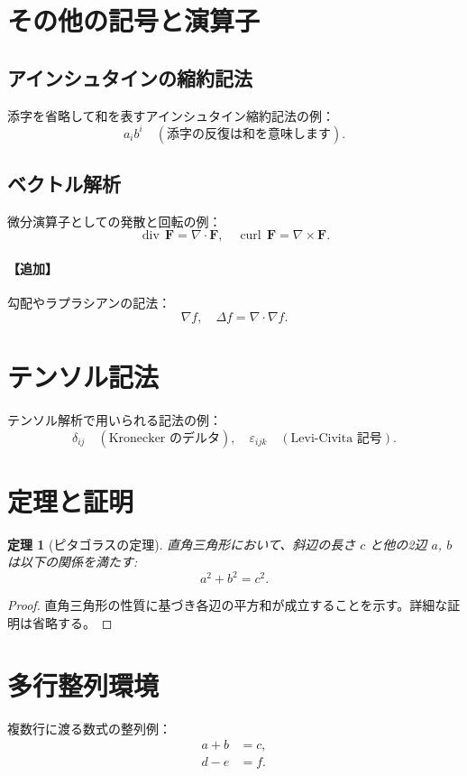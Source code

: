 \documentclass{ltjsarticle} %
\newtheorem{theorem}{定理}[section]
\begin{document}
\section{その他の記号と演算子}
\subsection{アインシュタインの縮約記法}
添字を省略して和を表すアインシュタイン縮約記法の例：
\[
  a_i b^i \quad (\text{添字の反復は和を意味します}).
\]

\subsection{ベクトル解析}
微分演算子としての発散と回転の例：
\[
  \operatorname{div} \, \mathbf{F} = \nabla \cdot \mathbf{F}, \quad \operatorname{curl} \, \mathbf{F} = \nabla \times \mathbf{F}.
\]
\paragraph{【追加】} 勾配やラプラシアンの記法：
\[
  \nabla f,\quad \Delta f = \nabla\cdot\nabla f.
\]

\section{テンソル記法}
テンソル解析で用いられる記法の例：
\[
  \delta_{ij} \quad (\text{Kronecker のデルタ}),\quad \varepsilon_{ijk} \quad (\text{Levi-Civita 記号}).
\]

\section{定理と証明}
\begin{theorem}[ピタゴラスの定理]
直角三角形において、斜辺の長さ \(c\) と他の2辺 \(a\), \(b\) は以下の関係を満たす:
\[
  a^2+b^2=c^2.
\]
\end{theorem}

\begin{proof}
直角三角形の性質に基づき各辺の平方和が成立することを示す。詳細な証明は省略する。
\end{proof}

\section{多行整列環境}
複数行に渡る数式の整列例：
\begin{align}
  a + b &= c, \\
  d - e &= f.
\end{align}
\end{document}
